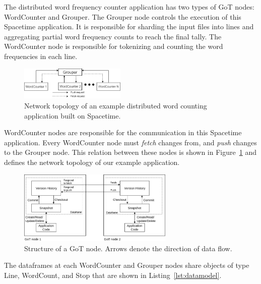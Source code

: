 The distributed word frequency counter application has two types of GoT nodes: WordCounter and Grouper. The Grouper node controls the execution of this Spacetime application. It is responsible for sharding the input files into lines and aggregating partial word frequency counts to reach the final tally. The WordCounter node is responsible for tokenizing and counting the word frequencies in each line. 

\begin{figure}
\centering
\includegraphics[width=0.45\textwidth]{images/network.png}
\caption{Network topology of an example distributed word counting application built on Spacetime.}
\label{fig:network}
\end{figure}

WordCounter nodes are responsible for the communication in this Spacetime application. Every WordCounter node must {\em fetch} changes from, and {\em push} changes to the Grouper node. This relation between these nodes is shown in Figure~\ref{fig:network} and defines the network topology of our example application. 

\begin{figure}
\centering
\includegraphics[width=0.66\textwidth]{images/GotNode.png}
\caption{Structure of a GoT node. Arrows denote the direction of data flow.}
\label{fig:gotnode}
\end{figure}

The dataframes at each WordCounter and Grouper nodes share objects of type Line, WordCount, and Stop that are shown in Listing~\ref{lst:datamodel}. 

